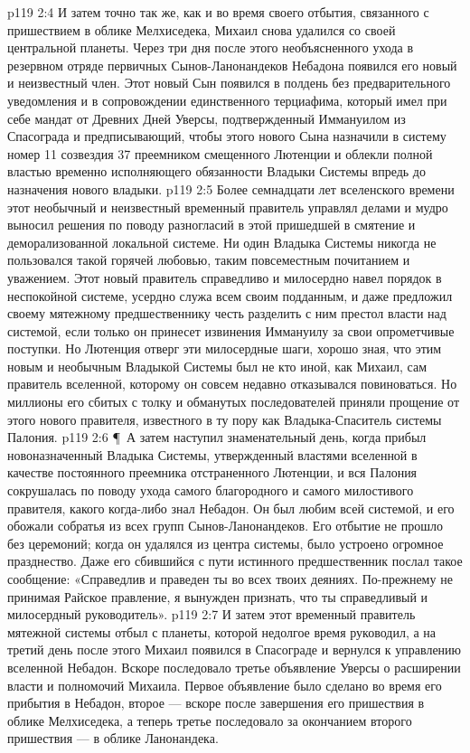 \vs p119 2:4 И затем точно так же, как и во время своего отбытия, связанного с пришествием в облике Мелхиседека, Михаил снова удалился со своей центральной планеты. Через три дня после этого необъясненного ухода в резервном отряде первичных Сынов\hyp{}Ланонандеков Небадона появился его новый и неизвестный член. Этот новый Сын появился в полдень без предварительного уведомления и в сопровождении единственного терциафима, который имел при себе мандат от Древних Дней Уверсы, подтвержденный Иммануилом из Спасограда и предписывающий, чтобы этого нового Сына назначили в систему номер 11 созвездия 37 преемником смещенного Лютенции и облекли полной властью временно исполняющего обязанности Владыки Системы впредь до назначения нового владыки.
\vs p119 2:5 Более семнадцати лет вселенского времени этот необычный и неизвестный временный правитель управлял делами и мудро выносил решения по поводу разногласий в этой пришедшей в смятение и деморализованной локальной системе. Ни один Владыка Системы никогда не пользовался такой горячей любовью, таким повсеместным почитанием и уважением. Этот новый правитель справедливо и милосердно навел порядок в неспокойной системе, усердно служа всем своим подданным, и даже предложил своему мятежному предшественнику честь разделить с ним престол власти над системой, если только он принесет извинения Иммануилу за свои опрометчивые поступки. Но Лютенция отверг эти милосердные шаги, хорошо зная, что этим новым и необычным Владыкой Системы был не кто иной, как Михаил, сам правитель вселенной, которому он совсем недавно отказывался повиноваться. Но миллионы его сбитых с толку и обманутых последователей приняли прощение от этого нового правителя, известного в ту пору как Владыка\hyp{}Спаситель системы Палония.
\vs p119 2:6 \P\ А затем наступил знаменательный день, когда прибыл новоназначенный Владыка Системы, утвержденный властями вселенной в качестве постоянного преемника отстраненного Лютенции, и вся Палония сокрушалась по поводу ухода самого благородного и самого милостивого правителя, какого когда\hyp{}либо знал Небадон. Он был любим всей системой, и его обожали собратья из всех групп Сынов\hyp{}Ланонандеков. Его отбытие не прошло без церемоний; когда он удалялся из центра системы, было устроено огромное празднество. Даже его сбившийся с пути истинного предшественник послал такое сообщение: «Справедлив и праведен ты во всех твоих деяниях. По\hyp{}прежнему не принимая Райское правление, я вынужден признать, что ты справедливый и милосердный руководитель».
\vs p119 2:7 И затем этот временный правитель мятежной системы отбыл с планеты, которой недолгое время руководил, а на третий день после этого Михаил появился в Спасограде и вернулся к управлению вселенной Небадон. Вскоре последовало третье объявление Уверсы о расширении власти и полномочий Михаила. Первое объявление было сделано во время его прибытия в Небадон, второе --- вскоре после завершения его пришествия в облике Мелхиседека, а теперь третье последовало за окончанием второго пришествия --- в облике Ланонандека.
